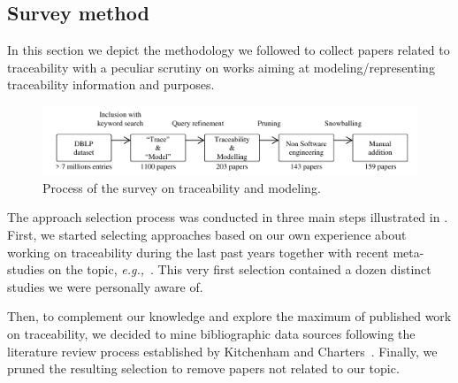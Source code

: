 \subsection{Survey method} \label{sec:survey}

In this section we depict the methodology we followed to collect papers related to traceability with a peculiar scrutiny on works aiming at modeling/representing traceability information and purposes.


\begin{figure}[h]
	\centering
	\includegraphics[width=.9\linewidth]{images/survey-process}
	\caption{Process of the survey on traceability and modeling. }
	\label{fig:surveyprocess}
\end{figure}
The approach selection process was conducted in three main steps illustrated in . First, we started selecting approaches based on our own experience about working on traceability during the last past years together with recent meta-studies on the topic, \textit{e.g.,}~\cite{Gotel2012,antoniol2017-traceability-grand-challenges,clelandhuang2014-traceability-trends-and-futurte-direction,guo2017-semantically-enhanced-tracebility-deep-learning}. This very first selection contained a dozen distinct studies we were personally aware of.  

Then, to complement our knowledge and explore the maximum of published work on traceability, we decided to mine bibliographic data sources following the literature review process established by Kitchenham and Charters~\cite{kitchenham2008}.
Finally, we pruned the resulting selection to remove papers not related to our topic.


